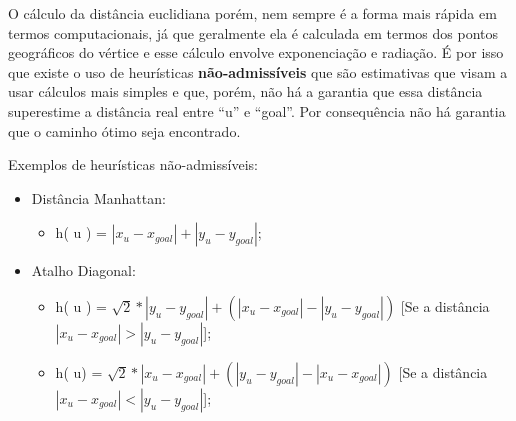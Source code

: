 O cálculo da distância euclidiana porém, nem sempre é a forma mais rápida em termos computacionais, já que geralmente ela é calculada em termos dos pontos geográficos do vértice e esse cálculo envolve exponenciação e radiação. É por isso que existe o uso de heurísticas \textbf{não-admissíveis} que são estimativas que visam a usar cálculos mais simples e que, porém, não há a garantia que essa distância superestime a distância real entre ``u'' e ``goal''. Por consequência não há garantia que o caminho ótimo seja encontrado.

Exemplos de heurísticas não-admissíveis:
\begin{itemize}
\item Distância Manhattan:
\begin{itemize}
\item h( u ) = $| x_{u} - x_{goal} | + | y_{u} - y_{goal}|$;
\end{itemize}
\item Atalho Diagonal:
\begin{itemize}
\item h( u ) = $\sqrt{2} * | y_{u} - y_{goal}| + ( | x_{u} - x_{goal} | - | y_{u} - y_{goal}| )$ [Se a distância $| x_{u} - x_{goal} | > | y_{u} - y_{goal}|$];
\item h( u) = $\sqrt{2} * | x_{u} - x_{goal}| + ( | y_{u} - y_{goal}| - | x_{u} - x_{goal} | )$ [Se a distância $| x_{u} - x_{goal} | < | y_{u} - y_{goal}|$];
\end{itemize}
\end{itemize}
